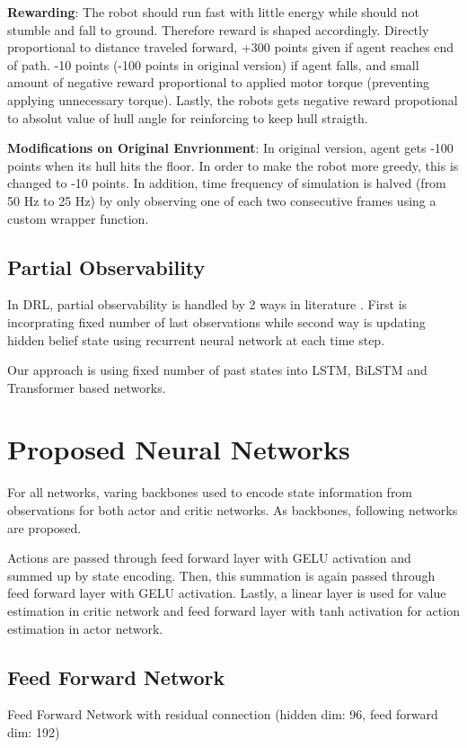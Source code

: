 \textbf{Rewarding}: The robot should run fast with little energy while should not stumble and fall to ground. Therefore reward is shaped accordingly. Directly proportional to distance traveled forward, +300 points given if agent reaches end of path. -10 points (-100 points in original version)  if agent falls, and small amount of negative reward proportional to applied motor torque (preventing applying unnecessary torque). Lastly, the robots gets negative reward propotional to absolut value of hull angle for reinforcing to keep hull straigth. 

\textbf{Modifications on Original Envrionment}: In original version, agent gets -100 points when its hull hits the floor. In order to make the robot more greedy, this is changed to -10 points. In addition, time frequency of simulation is halved (from 50 Hz to 25 Hz) by only observing one of each two consecutive frames using a custom wrapper function. 

\subsection{Partial Observability}
In DRL, partial observability is handled by 2 ways in literature \cite{dulac-arnold_challenges_2019}. First is incorprating fixed number of last observations while second way is updating hidden belief state using recurrent neural network at each time step. 

Our approach is using fixed number of past states into LSTM, BiLSTM and Transformer based networks. 

\section{Proposed Neural Networks}

For all networks, varing backbones used to encode state information from observations for both actor and critic networks. As backbones, following networks are proposed.

Actions are passed through feed forward layer with GELU activation and summed up by state encoding. Then, this summation is again passed through feed forward layer with GELU activation. Lastly, a linear layer is used for value estimation in critic network and feed forward layer with tanh activation for action estimation in actor network.

\subsection{Feed Forward Network}
Feed Forward Network with residual connection (hidden dim: 96, feed forward dim: 192)
